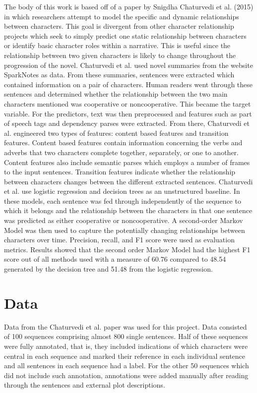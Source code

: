 \documentclass[11pt,a4paper]{article}
\begin{document}
The body of this work is based off of a paper by Snigdha Chaturvedi et al. (2015) in which researchers attempt to model the specific and dynamic relationships between characters. This goal is divergent from other character relationship projects which seek to simply predict one static relationship between characters or identify basic character roles within a narrative. This is useful since the relationship between two given characters is likely to change throughout the progression of the novel. Chaturvedi et al. used novel summaries from the website SparkNotes as data. From these summaries, sentences were extracted which contained information on a pair of characters. Human readers went through these sentences and determined whether the relationship between the two main characters mentioned was cooperative or noncooperative. This became the target variable. For the predictors, text was then preprocessed and features such as part of speech tags and dependency parses were extracted. From there, Chaturvedi et al. engineered two types of features: content based features and transition features. 
Content based features contain information concerning the verbs and adverbs that two characters complete together, separately, or one to another. Content features also include semantic parses which employs a number of frames to the input sentences. Transition features indicate whether the relationship between characters changes between the different extracted sentences. 
Chaturvedi et al. use logistic regression and decision trees as an unstructured baseline. In these models, each sentence was fed through independently of the sequence to which it belongs and the relationship between the characters in that one sentence was predicted as either cooperative or noncooperative. A second-order Markov Model was then used to capture the potentially changing relationships between characters over time. Precision, recall, and F1 score were used as evaluation metrics. Results showed that the second order Markov Model had the highest F1 score out of all methods used with a measure of 60.76 compared to 48.54 generated by the decision tree and 51.48 from the logistic regression. 

\section{Data}
Data from the Chaturvedi et al. paper was used for this project. Data consisted of 100 sequences comprising almost 800 single sentences. Half of these sequences were fully annotated, that is, they included indications of which characters were central in each sequence and marked their reference in each individual sentence and all sentences in each sequence had a label. For the other 50 sequences which did not include such annotation, annotations were added manually after reading through the sentences and external plot descriptions.
\end{document}
